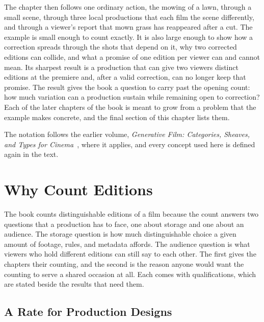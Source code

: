 \documentclass[11pt,twoside,openright]{book}
\theoremstyle{plain}
\theoremstyle{definition}
\theoremstyle{remark}
\begin{document}
The chapter then follows one ordinary action, the mowing of a lawn, through a small scene, through three local productions that each film the scene differently, and through a viewer's report that mown grass has reappeared after a cut. The example is small enough to count exactly. It is also large enough to show how a correction spreads through the shots that depend on it, why two corrected editions can collide, and what a promise of one edition per viewer can and cannot mean. Its sharpest result is a production that can give two viewers distinct editions at the premiere and, after a valid correction, can no longer keep that promise. The result gives the book a question to carry past the opening count: how much variation can a production sustain while remaining open to correction? Each of the later chapters of the book is meant to grow from a problem that the example makes concrete, and the final section of this chapter lists them.

The notation follows the earlier volume, \emph{Generative Film: Categories, Sheaves, and Types for Cinema}~\cite{flyxion2026gf}, where it applies, and every concept used here is defined again in the text.

\section{Why Count Editions}\label{sec:why}

The book counts distinguishable editions of a film because the count answers two questions that a production has to face, one about storage and one about an audience. The storage question is how much distinguishable choice a given amount of footage, rules, and metadata affords. The audience question is what viewers who hold different editions can still say to each other. The first gives the chapters their counting, and the second is the reason anyone would want the counting to serve a shared occasion at all. Each comes with qualifications, which are stated beside the results that need them.

\subsection{A Rate for Production Designs}
\end{document}
